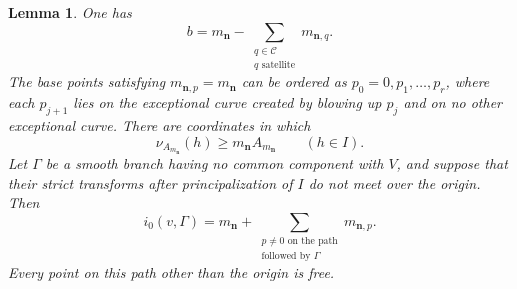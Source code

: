 \documentclass[11pt,letterpaper]{article}
\numberwithin{equation}{section}
\newtheorem{lemma}[lemma]{Lemma}
\theoremstyle{remark}
\theoremstyle{plain}
\begin{document}
\begin{lemma}
\label{lem:cluster}
One has
\begin{equation}
 b=m_{\boldsymbol{n}}
 -\sum_{\substack{q\in\mathcal C\\q\text{ satellite}}}
  m_{\boldsymbol{n},q}.                               \label{eq:branch-count}
\end{equation}
The base points satisfying $m_{\boldsymbol n,p}=m_{\boldsymbol n}$
can be ordered as $p_0=0,p_1,\ldots,p_r$, where each $p_{j+1}$ lies
on the exceptional curve created by blowing up $p_j$ and on no other
exceptional curve.  There are coordinates in which
\begin{equation}
\nu_{A_{m_{\boldsymbol n}}}(h)\geq m_{\boldsymbol n}A_{m_{\boldsymbol n}}\qquad(h\in I).         \label{eq:chain-value}
\end{equation}
Let $\Gamma$ be a smooth branch having no common component with
$V$, and suppose that their strict transforms after principalization
of $I$ do not meet over the origin.  Then
\begin{equation}
 i_0(v,\Gamma)=m_{\boldsymbol{n}}+
 \sum_{\substack{p\neq0\text{ on the path}\\
                  \text{followed by }\Gamma}}
                  m_{\boldsymbol{n},p}.                \label{eq:path-intersection}
\end{equation}
Every point on this path other than the origin is free.
\end{lemma}
\end{document}
